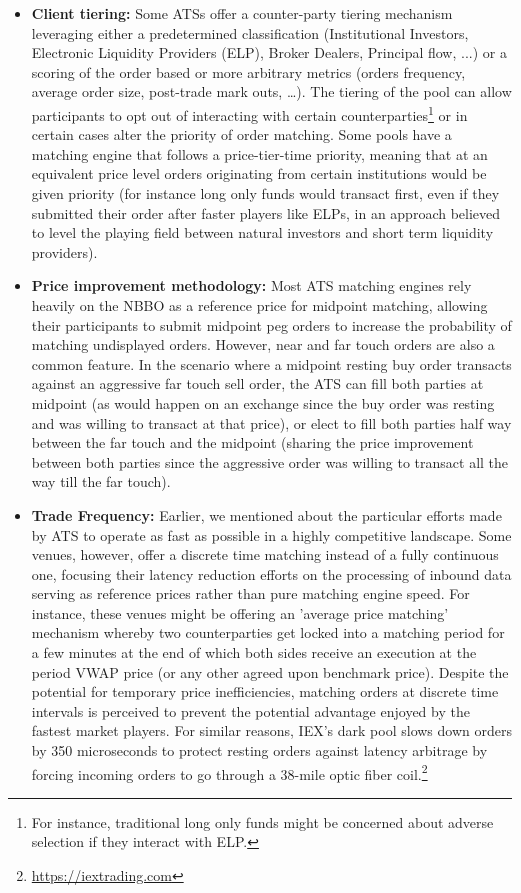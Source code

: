 \begin{itemize}
\item{\textbf{Client tiering:}}\label{in:client_t1} Some ATSs offer a counter-party tiering mechanism leveraging either a predetermined classification (Institutional Investors, Electronic Liquidity Providers (ELP), Broker Dealers, Principal flow, ...) or a scoring of the order based or more arbitrary metrics (orders frequency, average order size, post-trade mark outs, \dots). The tiering of the pool can allow participants to opt out of interacting with certain counterparties\footnote{For instance, traditional long only funds might be concerned about adverse selection if they interact with ELP.} or in certain cases alter the priority of order matching. Some pools have a matching engine that follows a price-tier-time priority, meaning that at an equivalent price level orders originating from certain institutions would be given priority (for instance long only funds would transact first, even if they submitted their order after faster players like ELPs, in an approach believed to level the playing field between natural investors and short term liquidity providers). \label{in:client_t2}

\item{\textbf{Price improvement methodology:}} Most ATS matching engines rely heavily on the NBBO as a reference price for midpoint matching, allowing their participants to submit midpoint peg orders to increase the probability of matching undisplayed orders. However, near and far touch orders are also a common feature. In the scenario where a midpoint resting buy order transacts against an aggressive far touch sell order, the ATS can fill both parties at midpoint (as would happen on an exchange since the buy order was resting and was willing to transact at that price), or elect to fill both parties half way between the far touch and the midpoint (sharing the price improvement between both parties since the aggressive order was willing to transact all the way till the far touch). 

\item{\textbf{Trade Frequency:}} Earlier, we mentioned about the particular efforts made by ATS to operate as fast as possible in a highly competitive landscape. Some venues, however, offer a discrete time matching instead of a fully continuous one, focusing their latency reduction efforts on the processing of inbound data serving as reference prices rather than pure matching engine speed. For instance, these venues might be offering an 'average price matching' mechanism whereby two counterparties get locked into a matching period for a few minutes at the end of which both sides receive an execution at the period VWAP price (or any other agreed upon benchmark price). Despite the potential for temporary price inefficiencies, matching orders at discrete time intervals is perceived to prevent the potential advantage enjoyed by the fastest market players. For similar reasons, IEX's dark pool slows down orders by 350 microseconds to protect resting orders against latency arbitrage by forcing incoming orders to go through a 38-mile optic fiber coil.\footnote{\url{https://iextrading.com}}


\end{itemize}
